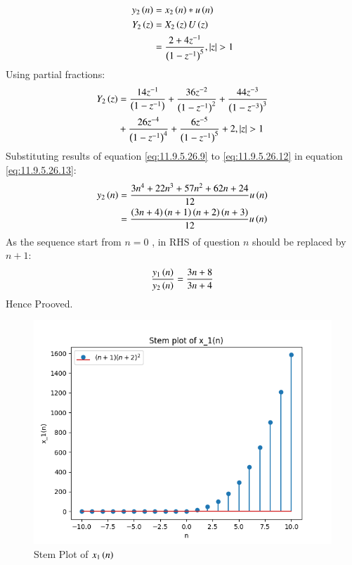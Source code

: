 \documentclass[journal,12pt,twocolumn]{IEEEtran}
\theoremstyle{remark}
\begin{document}
\begin{enumerate}[label=\arabic*.]
\begin{align}
    y_2\left(n\right) &= x_2\left(n\right)\ast u\left(n\right)\\
    Y_2\left(z\right) &= X_2\left(z\right) U\left(z\right) \\
 &=\frac{2+4z^{-1}}{\left(1-z^{-1}\right)^5} ,   \left\vert z\right\vert >1 
\end{align}
Using partial fractions:
\begin{align}
    Y_2\left(z\right) &= \frac{14z^{-1}}{\left(1-z^{-1}\right)} + \frac{36z^{-2}}{\left(1-z^{-1}\right)^2} + \frac{44z^{-3}}{\left(1-z^{-3}\right)^3} \label{eq:11.9.5.26.13}\\
    &+ \frac{26z^{-4}}{\left(1-z^{-1}\right)^4}+\frac{6z^{-5}}{\left(1-z^{-1}\right)^5}+2 , \left\vert z\right\vert>1\notag 
\end{align}
Substituting results of equation \eqref{eq:11.9.5.26.9} to \eqref{eq:11.9.5.26.12} in equation \eqref{eq:11.9.5.26.13}:
\begin{align}
    y_2\left(n\right) &=  \frac{3n^4 + 22n^3 + 57n^2 + 62n + 24}{12}u\left(n\right)\\
                &= \frac{\left(3n+4\right)\left(n+1\right)\left(n+2\right)\left(n+3\right)}{12}u\left(n\right)
\end{align}
As the sequence start from $n=0$ , in RHS of question $n$ should be replaced by $n+1$:
\begin{align}
    \frac{y_1\left(n\right)}{y_2\left(n\right)} = \frac{3n+8}{3n+4}
\end{align}
Hence Prooved.
\end{enumerate}
\begin{figure}[htbp]
    \centering
    \includegraphics[width=1\columnwidth]{figs/x1_plot.png}
    \caption{Stem Plot of $x_1\left(n\right)$}
    \label{fig:x1}
\end{figure}
\end{document}
